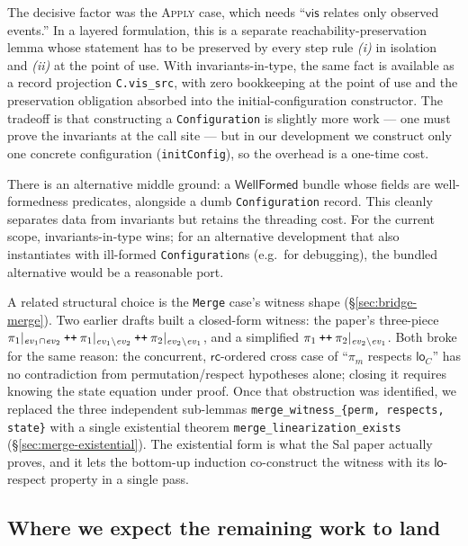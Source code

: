 \documentclass[11pt,a4paper]{article}
\theoremstyle{definition}
\theoremstyle{remark}
\newcommand{\mrc}{\mathsf{rc}}
\newcommand{\mvis}{\mathsf{vis}}
\newcommand{\mlo}{\mathsf{lo}}
\newcommand{\ev}{\mathit{ev}}
\begin{document}
The decisive factor was the \textsc{Apply} case, which needs ``$\mvis$
relates only observed events.'' In a layered formulation, this
is a separate reachability-preservation lemma whose statement has to
be preserved by every step rule \emph{(i)} in isolation and
\emph{(ii)} at the point of use. With invariants-in-type, the same
fact is available as a record projection \texttt{C.vis\_src}, with
zero bookkeeping at the point of use and the preservation obligation
absorbed into the initial-configuration constructor. The tradeoff
is that constructing a \texttt{Configuration} is slightly more
work --- one must prove the invariants at the call site --- but in
our development we construct only one concrete configuration
(\texttt{initConfig}), so the overhead is a one-time cost.

There is an alternative middle ground: a
$\mathsf{WellFormed}$ bundle whose fields are well-formedness
predicates, alongside a dumb \texttt{Configuration} record. This
cleanly separates data from invariants but retains the threading
cost. For the current scope, invariants-in-type wins; for an
alternative development that also instantiates with ill-formed
\texttt{Configuration}s (e.g.\ for debugging), the bundled
alternative would be a reasonable port.

A related structural choice is the \texttt{Merge} case's witness
shape (\S\ref{sec:bridge-merge}). Two earlier drafts built a
closed-form witness: the paper's three-piece
$\pi_1|_{\ev_1 \cap \ev_2} \mathbin{\text{\tt ++}}
 \pi_1|_{\ev_1 \setminus \ev_2} \mathbin{\text{\tt ++}}
 \pi_2|_{\ev_2 \setminus \ev_1}$,
and a simplified
$\pi_1 \mathbin{\text{\tt ++}} \pi_2|_{\ev_2 \setminus \ev_1}$.
Both broke for the same reason: the concurrent, $\mrc$-ordered
cross case of ``$\pi_m$ respects $\mlo_C$'' has no contradiction
from permutation/respect hypotheses alone; closing it requires
knowing the state equation under proof. Once that obstruction was
identified, we replaced the three independent sub-lemmas
\texttt{merge\_witness\_\{perm, respects, state\}} with a single
existential theorem \texttt{merge\_linearization\_exists}
(\S\ref{sec:merge-existential}). The existential form is what the
Sal paper actually proves, and it lets the bottom-up induction
co-construct the witness with its $\mlo$-respect property in a
single pass.

\subsection{Where we expect the remaining work to land}
\end{document}
